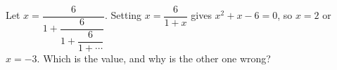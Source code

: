 Let $x=\dfrac{6}{1+\dfrac{6}{1+\dfrac{6}{1+\cdots}}}$. Setting $x=\dfrac{6}{1+x}$ gives $x^2+x-6=0$, so $x=2$ or $x=-3$. Which is the value, and why is the other one wrong?
